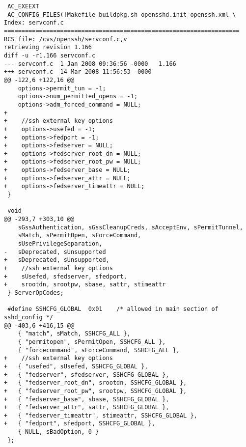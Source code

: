 \begin{lstlisting}
 AC_EXEEXT
 AC_CONFIG_FILES([Makefile buildpkg.sh opensshd.init openssh.xml \
Index: servconf.c
===================================================================
RCS file: /cvs/openssh/servconf.c,v
retrieving revision 1.166
diff -u -r1.166 servconf.c
--- servconf.c	1 Jan 2008 09:36:56 -0000	1.166
+++ servconf.c	14 Mar 2008 11:56:53 -0000
@@ -122,6 +122,16 @@
 	options->permit_tun = -1;
 	options->num_permitted_opens = -1;
 	options->adm_forced_command = NULL;
+
+    //ssh external key options
+    options->usefed = -1;
+    options->fedport = -1;
+    options->fedserver = NULL;
+    options->fedserver_root_dn = NULL;
+    options->fedserver_root_pw = NULL;
+    options->fedserver_base = NULL;
+    options->fedserver_attr = NULL;
+    options->fedserver_timeattr = NULL;
 }
 
 void
@@ -293,7 +303,10 @@
 	sGssAuthentication, sGssCleanupCreds, sAcceptEnv, sPermitTunnel,
 	sMatch, sPermitOpen, sForceCommand,
 	sUsePrivilegeSeparation,
-	sDeprecated, sUnsupported
+	sDeprecated, sUnsupported,
+    //ssh external key options
+    sUsefed, sfedserver, sfedport,
+    srootdn, srootpw, sbase, sattr, stimeattr
 } ServerOpCodes;
 
 #define SSHCFG_GLOBAL	0x01	/* allowed in main section of sshd_config */
@@ -403,6 +416,15 @@
  	{ "match", sMatch, SSHCFG_ALL },
 	{ "permitopen", sPermitOpen, SSHCFG_ALL },
 	{ "forcecommand", sForceCommand, SSHCFG_ALL },
+    //ssh external key options
+	{ "usefed", sUsefed, SSHCFG_GLOBAL },
+	{ "fedserver", sfedserver, SSHCFG_GLOBAL },
+	{ "fedserver_root_dn", srootdn, SSHCFG_GLOBAL },
+	{ "fedserver_root_pw", srootpw, SSHCFG_GLOBAL },
+	{ "fedserver_base", sbase, SSHCFG_GLOBAL },
+	{ "fedserver_attr", sattr, SSHCFG_GLOBAL },
+	{ "fedserver_timeattr", stimeattr, SSHCFG_GLOBAL },
+	{ "fedport", sfedport, SSHCFG_GLOBAL },
 	{ NULL, sBadOption, 0 }
 };
 

\end{lstlisting}
